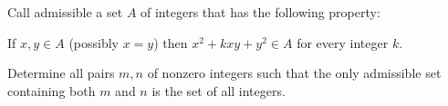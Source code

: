 Call admissible a set 
$A$
 of integers that has the following property:


If 
$x,y \in A$
 (possibly 
$x=y$)
 then 
$x^2+kxy+y^2 \in A$
 for every integer 
$k$.


Determine all pairs 
$m,n$
 of nonzero integers such that the only admissible set containing both 
$m$
 and 
$n$
 is the set of all integers.
